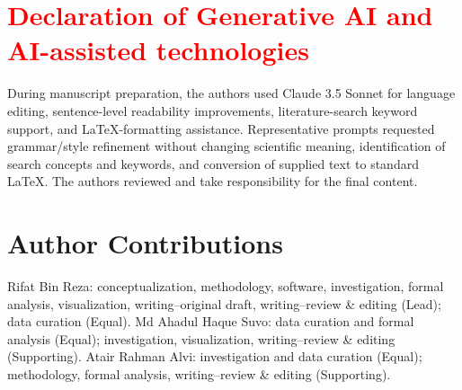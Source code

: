 \documentclass{elektr}
\begin{document}
\section*{\textcolor{red}{Declaration of Generative AI and AI-assisted technologies}}
During manuscript preparation, the authors used Claude 3.5 Sonnet for language editing, sentence-level readability improvements, literature-search keyword support, and LaTeX-formatting assistance. Representative prompts requested grammar/style refinement without changing scientific meaning, identification of search concepts and keywords, and conversion of supplied text to standard LaTeX. The authors reviewed and take responsibility for the final content.

\section{Author Contributions}

Rifat Bin Reza: conceptualization, methodology, software, investigation, formal analysis, visualization, writing--original draft, writing--review \& editing (Lead); data curation (Equal). Md Ahadul Haque Suvo: data curation and formal analysis (Equal); investigation, visualization, writing--review \& editing (Supporting). Atair Rahman Alvi: investigation and data curation (Equal); methodology, formal analysis, writing--review \& editing (Supporting).
\end{document}

